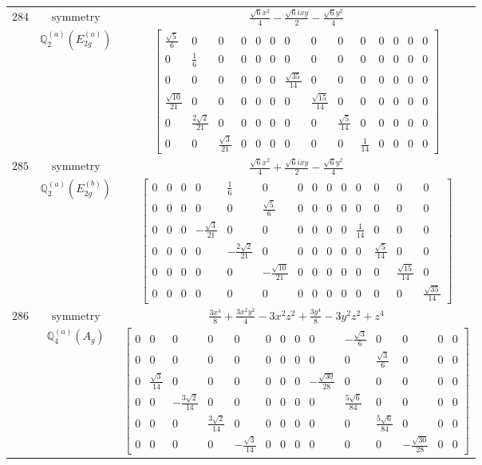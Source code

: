 \documentclass[fleqn,8pt,landscape]{jsarticle}
\begin{document}
\begin{longtable}{ccc}
$ 284 $ & $ \text{symmetry} $ & $ \frac{\sqrt{6} x^{2}}{4} - \frac{\sqrt{6} i x y}{2} - \frac{\sqrt{6} y^{2}}{4} $ \\
$  $ & $ \mathbb{Q}_{2}^{(a)}(E_{2g}^{(a)}) $ & $ \begin{bmatrix} \frac{\sqrt{5}}{6} & 0 & 0 & 0 & 0 & 0 & 0 & 0 & 0 & 0 & 0 & 0 & 0 & 0 \\ 0 & \frac{1}{6} & 0 & 0 & 0 & 0 & 0 & 0 & 0 & 0 & 0 & 0 & 0 & 0 \\ 0 & 0 & 0 & 0 & 0 & 0 & \frac{\sqrt{35}}{14} & 0 & 0 & 0 & 0 & 0 & 0 & 0 \\ \frac{\sqrt{10}}{21} & 0 & 0 & 0 & 0 & 0 & 0 & \frac{\sqrt{15}}{14} & 0 & 0 & 0 & 0 & 0 & 0 \\ 0 & \frac{2 \sqrt{2}}{21} & 0 & 0 & 0 & 0 & 0 & 0 & \frac{\sqrt{5}}{14} & 0 & 0 & 0 & 0 & 0 \\ 0 & 0 & \frac{\sqrt{3}}{21} & 0 & 0 & 0 & 0 & 0 & 0 & \frac{1}{14} & 0 & 0 & 0 & 0 \end{bmatrix} $ \\ \hline
$ 285 $ & $ \text{symmetry} $ & $ \frac{\sqrt{6} x^{2}}{4} + \frac{\sqrt{6} i x y}{2} - \frac{\sqrt{6} y^{2}}{4} $ \\
$  $ & $ \mathbb{Q}_{2}^{(a)}(E_{2g}^{(b)}) $ & $ \begin{bmatrix} 0 & 0 & 0 & 0 & \frac{1}{6} & 0 & 0 & 0 & 0 & 0 & 0 & 0 & 0 & 0 \\ 0 & 0 & 0 & 0 & 0 & \frac{\sqrt{5}}{6} & 0 & 0 & 0 & 0 & 0 & 0 & 0 & 0 \\ 0 & 0 & 0 & - \frac{\sqrt{3}}{21} & 0 & 0 & 0 & 0 & 0 & 0 & \frac{1}{14} & 0 & 0 & 0 \\ 0 & 0 & 0 & 0 & - \frac{2 \sqrt{2}}{21} & 0 & 0 & 0 & 0 & 0 & 0 & \frac{\sqrt{5}}{14} & 0 & 0 \\ 0 & 0 & 0 & 0 & 0 & - \frac{\sqrt{10}}{21} & 0 & 0 & 0 & 0 & 0 & 0 & \frac{\sqrt{15}}{14} & 0 \\ 0 & 0 & 0 & 0 & 0 & 0 & 0 & 0 & 0 & 0 & 0 & 0 & 0 & \frac{\sqrt{35}}{14} \end{bmatrix} $ \\ \hline
$ 286 $ & $ \text{symmetry} $ & $ \frac{3 x^{4}}{8} + \frac{3 x^{2} y^{2}}{4} - 3 x^{2} z^{2} + \frac{3 y^{4}}{8} - 3 y^{2} z^{2} + z^{4} $ \\
$  $ & $ \mathbb{Q}_{4}^{(a)}(A_{g}) $ & $ \begin{bmatrix} 0 & 0 & 0 & 0 & 0 & 0 & 0 & 0 & 0 & - \frac{\sqrt{3}}{6} & 0 & 0 & 0 & 0 \\ 0 & 0 & 0 & 0 & 0 & 0 & 0 & 0 & 0 & 0 & \frac{\sqrt{3}}{6} & 0 & 0 & 0 \\ 0 & \frac{\sqrt{3}}{14} & 0 & 0 & 0 & 0 & 0 & 0 & - \frac{\sqrt{30}}{28} & 0 & 0 & 0 & 0 & 0 \\ 0 & 0 & - \frac{3 \sqrt{2}}{14} & 0 & 0 & 0 & 0 & 0 & 0 & \frac{5 \sqrt{6}}{84} & 0 & 0 & 0 & 0 \\ 0 & 0 & 0 & \frac{3 \sqrt{2}}{14} & 0 & 0 & 0 & 0 & 0 & 0 & \frac{5 \sqrt{6}}{84} & 0 & 0 & 0 \\ 0 & 0 & 0 & 0 & - \frac{\sqrt{3}}{14} & 0 & 0 & 0 & 0 & 0 & 0 & - \frac{\sqrt{30}}{28} & 0 & 0 \end{bmatrix} $ \\ \hline

\end{longtable}
\end{document}
